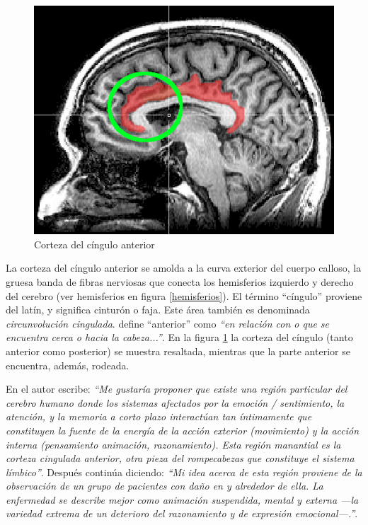 \begin{figure}[h]
  \begin{center}
    \includegraphics[scale=0.5]{images/cingulo.png}
    \caption{Corteza del cíngulo anterior}
    \label{cingulo}
  \end{center}
\end{figure}

La corteza del cíngulo anterior se amolda a la curva exterior del cuerpo calloso, la gruesa banda de fibras nerviosas que conecta los hemisferios izquierdo y derecho del cerebro (ver hemisferios en figura \ref{hemisferios}). El término ``cíngulo'' proviene del latín, y significa cinturón o faja. Este área también es denominada {\it circunvolución cingulada}. \cite{Lindberg.} define ``anterior'' como  {\it ``en relación con o que se encuentra cerca o hacia la cabeza...''}. En la figura \ref{cingulo} la corteza del cíngulo (tanto anterior como posterior) se muestra resaltada, mientras que la parte anterior se encuentra, además, rodeada.

En \cite{Damasio1994} el autor escribe: {\it ``Me gustaría proponer que existe una región particular del cerebro humano donde los sistemas afectados por la emoción / sentimiento, la atención, y la memoria a corto plazo interactúan tan íntimamente que constituyen la fuente de la energía de la acción exterior (movimiento) y la acción interna (pensamiento animación, razonamiento). Esta región manantial es la corteza cingulada anterior, otra pieza del rompecabezas que constituye el sistema límbico''}. Después continúa diciendo: {\it ``Mi idea acerca de esta región proviene de la observación de un grupo de pacientes con daño en y alrededor de ella. La enfermedad se describe mejor como animación suspendida, mental y externa ---la variedad extrema de un deterioro del razonamiento y de expresión emocional---.''}.

